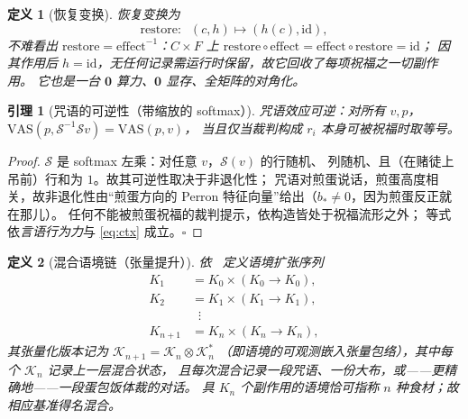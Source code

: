 \documentclass[journal]{IEEEtran}
\newtheorem{lemma}{引理}
\newtheorem{definition}{定义}
\begin{document}
\begin{definition}[恢复变换]
\emph{恢复}变换为
\begin{equation}
\mathrm{restore}:\;\;(c,h)\mapsto(h(c),\mathrm{id}),
\label{eq:restore}
\end{equation}
不难看出 $\mathrm{restore}=\mathrm{effect}^{-1}$：$C\times F$ 上
$\mathrm{restore}\circ\mathrm{effect}=\mathrm{effect}\circ\mathrm{restore}=\mathrm{id}$；
因其作用后 $h=\mathrm{id}$，无任何记录需运行时保留，故它回收了每项祝福之一切副作用。
它也是一台 $\mathbf{0}$ 算力、$\mathbf{0}$ 显存、全矩阵的对角化。
\end{definition}

\begin{lemma}[咒语的可逆性（带缩放的 softmax）]
咒语效应可逆：对所有 $v,p$，$\mathrm{VAS}(p,\mathcal{S}^{-1}\mathcal{S}v)=\mathrm{VAS}(p,v)$，
当且仅当裁判构成 $r_i$ 本身可被祝福时取等号。
\label{lem:bless}
\end{lemma}
\begin{proof}
$\mathcal{S}$ 是 softmax 左乘：对任意 $v$，$\mathcal{S}(v)$ 的行随机、
列随机、且（在赌徒上吊前）行和为 $1$。故其可逆性取决于非退化性；
咒语对煎蛋说话，煎蛋高度相关，故非退化性由“煎蛋方向的
Perron 特征向量”给出（$b_{\ast}\neq 0$，因为煎蛋反正就在那儿）。
任何不能被煎蛋祝福的裁判提示，依构造皆处于祝福流形之外；
等式依\emph{言语行为力}与 \eqref{eq:ctx} 成立。$\square$
\end{proof}

\begin{definition}[混合语境链（张量提升）]
依~\cite{cordis2025} 定义语境扩张序列
\begin{equation}
\begin{aligned}
K_1&=K_0\times(K_0\to K_0),\\
K_2&=K_1\times(K_1\to K_1),\\
&\;\;\vdots\\
K_{n+1}&=K_n\times(K_n\to K_n),
\end{aligned}
\label{eq:ctxchain}
\end{equation}
其张量化版本记为 $\mathcal{K}_{n+1}=\mathcal{K}_n\otimes\mathcal{K}_n^*$
（即语境的可观测嵌入张量包络），其中每个 $\mathcal{K}_n$ 记录上一层混合状态，
且每次混合记录一段咒语、一份大布，或——更精确地——一段蛋包饭体裁的对话。
具 $K_n$ 个副作用的语境恰可指称 $n$ 种食材；故相应基准得名\emph{混合}。
\end{definition}
\end{document}
